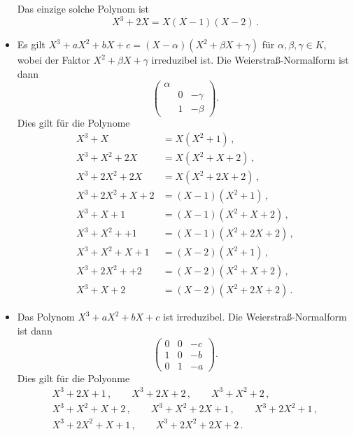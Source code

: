 \begin{itemize}
\[    \]
    Das einzige solche Polynom ist
    \[
      X^3 + 2X = X(X-1)(X-2) \,.
    \]
  \item
    Es gilt $X^3 + a X^2 + b X + c = (X - \alpha)(X^2 + \beta X + \gamma)$ für $\alpha, \beta, \gamma \in K$, wobei der Faktor $X^2 + \beta X + \gamma$ irreduzibel ist.
    Die Weierstraß-Normalform ist dann
    \[
      \begin{pmatrix}
        \alpha  &   &         \\
                & 0 & -\gamma \\
                & 1 & -\beta
      \end{pmatrix}.
    \]
    Dies gilt für die Polynome
    \begin{align*}
      X^3         +   X     &=  X (X^2 + 1)           \,, \\
      X^3 +   X^2 + 2 X     &=  X (X^2 + X + 2)       \,, \\
      X^3 + 2 X^2 + 2 X     &=  X (X^2 + 2 X + 2)     \,, \\
      X^3 + 2 X^2 +   X + 2 &=  (X-1) (X^2 + 1)       \,, \\
      X^3         +   X + 1 &=  (X-1) (X^2 + X + 2)   \,, \\
      X^3 +   X^2 +     + 1 &=  (X-1) (X^2 + 2X + 2)  \,, \\
      X^3 +   X^2 +   X + 1 &=  (X-2) (X^2 + 1)       \,, \\
      X^3 + 2 X^2 +     + 2 &=  (X-2) (X^2 + X + 2)   \,, \\
      X^3         +   X + 2 &=  (X-2) (X^2 + 2X + 2)  \,.
    \end{align*}
  \item
    Das Polynom $X^3 + a X^2 + b X + c$ ist irreduzibel.
    Die Weierstraß-Normalform ist dann
    \[
      \begin{pmatrix}
        0 & 0 & -c  \\
        1 & 0 & -b  \\
        0 & 1 & -a
      \end{pmatrix}.
    \]
    Dies gilt für die Polyonme
    \begin{gather*}
      X^3         + 2 X + 1 \,,
      \qquad
      X^3         + 2 X + 2 \,,
      \qquad
      X^3 +   X^2       + 2 \,,
      \\
      X^3 +   X^2 +   X + 2 \,,
      \qquad
      X^3 +   X^2 + 2 X + 1 \,,
      \qquad
      X^3 + 2 X^2       + 1 \,,
      \\
      X^3 + 2 X^2 +   X + 1 \,,
      \qquad
      X^3 + 2 X^2 + 2 X + 2 \,.
    \end{gather*}
\end{itemize}


